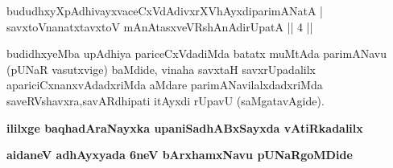 
\begin{shl}
bududhxyXpAdhivayxvaceCxVdAdivxrXVhAyxdiparimANatA | \\
savxtoV\s nanatxtavxtoV mAnAtasxveVRshAnAdirUpatA \hfill ||  4 || 
\end{shl}

\begin{artha}
budidhxyeMba upAdhiya pariceCxVdadiMda batatx muMtAda parimANavu (pUNaR vasutxvige) baMdide, vinaha savxtaH savxrUpadalilx apariciCxnanxvAdadxriMda aMdare parimANavilalxdadxriMda saveRVshavxra,\break savARdhipati itAyxdi rUpavU (saMgatavAgide).
\end{artha}

\begin{center}
{\bf ililxge baqhadAraNayxka upaniSadhABxSayxda vAtiRkadalilx}
\smallskip

{\bf aidaneV adhAyxyada 6neV bArxhamxNavu pUNaRgoMDide}
\smallskip

\end{center}
